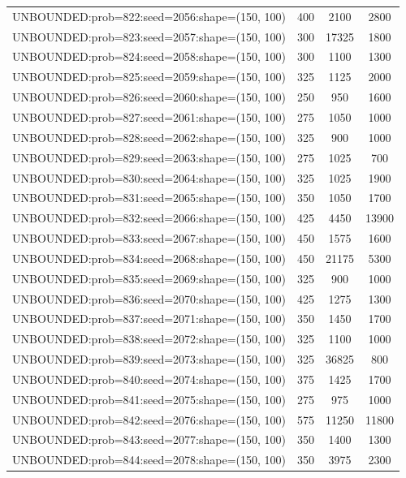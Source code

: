 \begin{longtable}{lccc}
UNBOUNDED:prob=822:seed=2056:shape=(150, 100) &      400 &  2100 &   2800 \\
UNBOUNDED:prob=823:seed=2057:shape=(150, 100) &      300 & 17325 &   1800 \\
UNBOUNDED:prob=824:seed=2058:shape=(150, 100) &      300 &  1100 &   1300 \\
UNBOUNDED:prob=825:seed=2059:shape=(150, 100) &      325 &  1125 &   2000 \\
UNBOUNDED:prob=826:seed=2060:shape=(150, 100) &      250 &   950 &   1600 \\
UNBOUNDED:prob=827:seed=2061:shape=(150, 100) &      275 &  1050 &   1000 \\
UNBOUNDED:prob=828:seed=2062:shape=(150, 100) &      325 &   900 &   1000 \\
UNBOUNDED:prob=829:seed=2063:shape=(150, 100) &      275 &  1025 &    700 \\
UNBOUNDED:prob=830:seed=2064:shape=(150, 100) &      325 &  1025 &   1900 \\
UNBOUNDED:prob=831:seed=2065:shape=(150, 100) &      350 &  1050 &   1700 \\
UNBOUNDED:prob=832:seed=2066:shape=(150, 100) &      425 &  4450 &  13900 \\
UNBOUNDED:prob=833:seed=2067:shape=(150, 100) &      450 &  1575 &   1600 \\
UNBOUNDED:prob=834:seed=2068:shape=(150, 100) &      450 & 21175 &   5300 \\
UNBOUNDED:prob=835:seed=2069:shape=(150, 100) &      325 &   900 &   1000 \\
UNBOUNDED:prob=836:seed=2070:shape=(150, 100) &      425 &  1275 &   1300 \\
UNBOUNDED:prob=837:seed=2071:shape=(150, 100) &      350 &  1450 &   1700 \\
UNBOUNDED:prob=838:seed=2072:shape=(150, 100) &      325 &  1100 &   1000 \\
UNBOUNDED:prob=839:seed=2073:shape=(150, 100) &      325 & 36825 &    800 \\
UNBOUNDED:prob=840:seed=2074:shape=(150, 100) &      375 &  1425 &   1700 \\
UNBOUNDED:prob=841:seed=2075:shape=(150, 100) &      275 &   975 &   1000 \\
UNBOUNDED:prob=842:seed=2076:shape=(150, 100) &      575 & 11250 &  11800 \\
UNBOUNDED:prob=843:seed=2077:shape=(150, 100) &      350 &  1400 &   1300 \\
UNBOUNDED:prob=844:seed=2078:shape=(150, 100) &      350 &  3975 &   2300 \\

\end{longtable}

